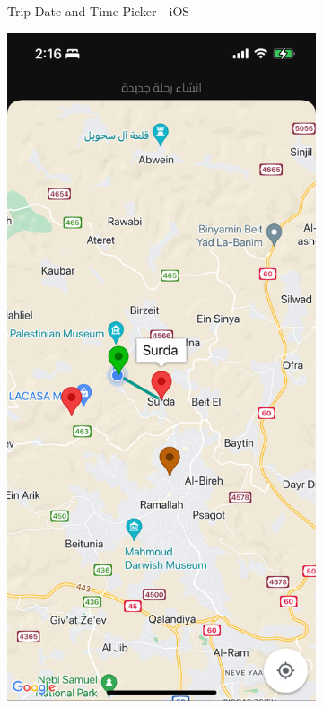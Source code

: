 \documentclass[a4paper, 12pt]{report} %
\begin{document}
\begin{figure}[H]
\begin{subfigure}{0.3\textwidth}
                    \caption{Trip Date and Time Picker - iOS}
                    \label{fig:trip_cration_2}
                \end{subfigure}
                \begin{subfigure}{0.3\textwidth}
                    \includegraphics[width=\linewidth]{Images/trip_creation_3.png}  

\end{subfigure}
\end{figure}
\end{document}
